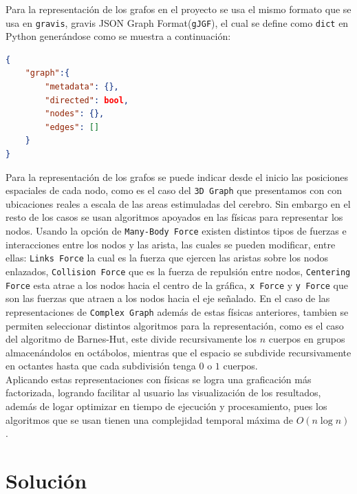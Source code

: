 \documentclass[a4paper,10pt,twocolumn]{article}
\begin{document}
Para la representación de los grafos en el proyecto se usa el mismo formato que se usa en \texttt{gravis}, gravis JSON Graph Format(\texttt{gJGF}),
el cual se define como \texttt{dict} en Python generándose como se muestra a continuación:

\begin{lstlisting}[language=json,firstnumber=1]
{
	"graph":{
		"metadata": {},
		"directed": bool,
		"nodes": {},
		"edges": []
	}	
}
\end{lstlisting}


Para la representación de los grafos se puede indicar desde el inicio las posiciones espaciales de cada nodo,
como es el caso del \texttt{3D Graph} que presentamos con con ubicaciones reales a escala de las areas estimuladas del cerebro.
Sin embargo en el resto de los casos se usan algoritmos apoyados en las físicas para representar los nodos.
Usando la opción de \texttt{Many-Body Force} existen distintos tipos de fuerzas e interacciones entre los nodos y las arista,
las cuales se pueden modificar, entre ellas: \texttt{Links Force} la cual es la fuerza que ejercen las aristas sobre los nodos
enlazados, \texttt{Collision Force} que es la fuerza de repulsión entre nodos, \texttt{Centering Force} esta atrae a los nodos hacia el centro de la gráfica,
\texttt{x Force} y \texttt{y Force} que son las fuerzas que atraen a los nodos hacia el eje señalado.
En el caso de las representaciones de \texttt{Complex Graph} además de estas físicas anteriores, tambien se permiten seleccionar distintos algoritmos para la representación,
como es el caso del algoritmo de Barnes-Hut, este divide recursivamente los $n$ cuerpos en grupos almacenándolos en octábolos, mientras que el espacio
se subdivide recursivamente en octantes hasta que cada subdivisión tenga $0$ o $1$ cuerpos.
\\

Aplicando estas representaciones con físicas se logra una graficación más factorizada, logrando facilitar al usuario las visualización
de los resultados, además de logar optimizar en tiempo de ejecución y procesamiento, pues los algoritmos que se usan tienen una complejidad temporal máxima de $O(n\log{n})$.\\




\section*{Solución}
\end{document}
